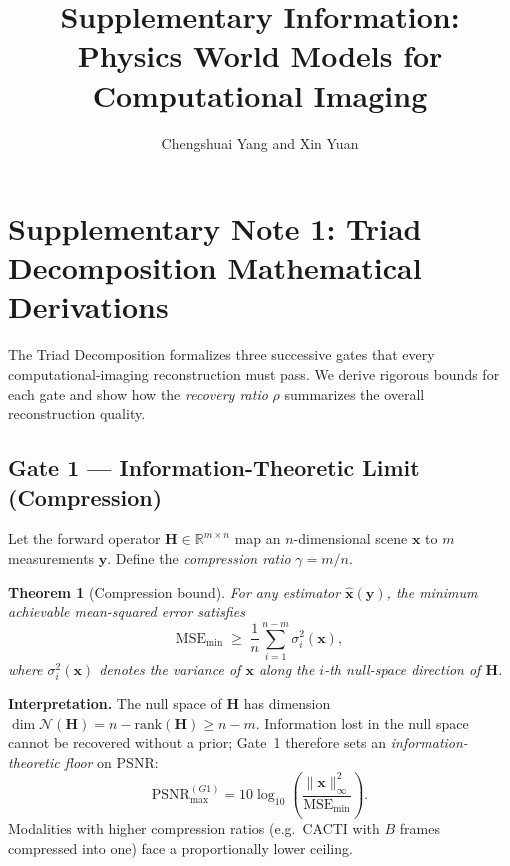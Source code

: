 \documentclass[11pt]{article}
\title{Supplementary Information:\\Physics World Models for Computational Imaging}
\author{Chengshuai Yang and Xin Yuan}
\date{}
\newtheorem{theorem}{Theorem}
\theoremstyle{definition}
\begin{document}
\maketitle

\renewcommand{\thetable}{S\arabic{table}}
\renewcommand{\thefigure}{S\arabic{figure}}
\renewcommand{\theequation}{S\arabic{equation}}
\setcounter{table}{0}
\setcounter{figure}{0}
\setcounter{equation}{0}

\tableofcontents
\newpage

\section{Supplementary Note 1: Triad Decomposition Mathematical Derivations}
\label{sec:triad}

The Triad Decomposition formalizes three successive gates that every computational-imaging
reconstruction must pass.  We derive rigorous bounds for each gate and show how
the \emph{recovery ratio} $\rho$ summarizes the overall reconstruction quality.

\subsection{Gate 1 --- Information-Theoretic Limit (Compression)}

Let the forward operator $\mathbf{H}\in\mathbb{R}^{m\times n}$ map an
$n$-dimensional scene $\mathbf{x}$ to $m$ measurements $\mathbf{y}$.
Define the \emph{compression ratio} $\gamma = m/n$.

\begin{theorem}[Compression bound]
For any estimator $\hat{\mathbf{x}}(\mathbf{y})$, the minimum achievable
mean-squared error satisfies
\begin{equation}
  \mathrm{MSE}_{\min} \;\geq\;
  \frac{1}{n}\sum_{i=1}^{n-m} \sigma_i^2(\mathbf{x}),
  \label{eq:gate1}
\end{equation}
where $\sigma_i^2(\mathbf{x})$ denotes the variance of $\mathbf{x}$ along the
$i$-th null-space direction of $\mathbf{H}$.
\end{theorem}

\noindent\textbf{Interpretation.}
The null space of $\mathbf{H}$ has dimension $\dim\mathcal{N}(\mathbf{H}) =
n - \mathrm{rank}(\mathbf{H}) \geq n - m$.  Information lost in the null space
cannot be recovered without a prior; Gate~1 therefore sets an
\emph{information-theoretic floor} on PSNR:
\begin{equation}
  \mathrm{PSNR}_{\max}^{(G1)}
  = 10\log_{10}\!\!\left(\frac{\|\mathbf{x}\|_\infty^2}{\mathrm{MSE}_{\min}}\right).
\end{equation}
Modalities with higher compression ratios (e.g.\ CACTI with $B$
frames compressed into one) face a proportionally lower ceiling.
\end{document}
